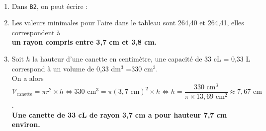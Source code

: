 \ \\ [-5mm]
\begin{enumerate}
   \item Dans \texttt{B2}, on peut écrire : 
   \item Les valeurs minimales pour l'aire dans le tableau sont 264,40 et 264,41, elles correspondent à \\
   {\bf un rayon compris entre 3,7 cm et 3,8 cm.}
   \item Soit $h$ la hauteur d'une canette en centimètre, une capacité de 33 cL = 0,33 L correspond à un volume de 0,33 dm$^3$ =330 cm$^3$. \\
   On a alors $\mathcal{V}_{\text{canette}} =\pi r^2\times h \iff 330\text{ cm}^3 = \pi (3,7\text{ cm})^2\times h \iff h =\dfrac{330\text{ cm}^3}{\pi\times13,69\text{ cm}^2} \approx7,67\text{ cm}$. \\
  {\bf Une canette de 33 cL de rayon 3,7 cm a pour hauteur 7,7 cm environ.}
\end{enumerate}
